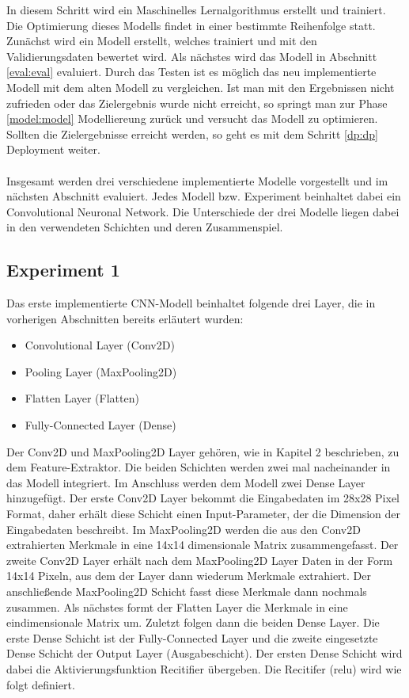 \documentclass[12pt]{scrreprt}
\begin{document}
In diesem Schritt wird ein Maschinelles Lernalgorithmus erstellt und trainiert. Die Optimierung dieses Modells findet in einer bestimmte Reihenfolge statt. Zunächst wird ein Modell erstellt, welches trainiert und mit den Validierungsdaten bewertet wird. Als nächstes wird das Modell in Abschnitt \ref{eval:eval} evaluiert. Durch das Testen ist es möglich das neu implementierte Modell mit dem alten Modell zu vergleichen. Ist man mit den Ergebnissen nicht zufrieden oder das Zielergebnis wurde nicht erreicht, so springt man zur Phase \ref{model:model} Modelliereung zurück und versucht das Modell zu optimieren. Sollten die Zielergebnisse erreicht werden, so geht es mit dem Schritt \ref{dp:dp} Deployment weiter.\\
\\
Insgesamt werden drei verschiedene implementierte Modelle vorgestellt und im nächsten Abschnitt evaluiert. Jedes Modell bzw. Experiment beinhaltet dabei ein Convolutional Neuronal Network. Die Unterschiede der drei Modelle liegen dabei in den verwendeten Schichten und deren Zusammenspiel. 
	
\subsection{Experiment 1}\label{model:ep1}
	
Das erste implementierte CNN-Modell beinhaltet folgende drei Layer, die in vorherigen Abschnitten bereits erläutert wurden:
	
\begin{itemize}
	\item Convolutional Layer (Conv2D)
	\item Pooling Layer (MaxPooling2D)
	\item Flatten Layer (Flatten)
	\item Fully-Connected Layer (Dense)
	\label{tab:model1}
\end{itemize}
	
Der Conv2D und MaxPooling2D Layer gehören, wie in Kapitel 2 beschrieben, zu dem Feature-Extraktor. Die beiden Schichten werden zwei mal nacheinander in das Modell integriert. Im Anschluss werden dem Modell zwei Dense Layer hinzugefügt. Der erste Conv2D Layer bekommt die Eingabedaten im 28x28 Pixel Format, daher erhält diese Schicht einen Input-Parameter, der die Dimension der Eingabedaten beschreibt. Im MaxPooling2D werden die aus den Conv2D extrahierten Merkmale in eine 14x14 dimensionale Matrix zusammengefasst. Der zweite Conv2D Layer erhält nach dem MaxPooling2D Layer Daten in der Form 14x14 Pixeln, aus dem der Layer dann wiederum Merkmale extrahiert. Der anschließende MaxPooling2D Schicht fasst diese Merkmale dann nochmals zusammen. Als nächstes formt der Flatten Layer die Merkmale in eine eindimensionale Matrix um. Zuletzt folgen dann die beiden Dense Layer. Die erste Dense Schicht ist der Fully-Connected Layer und die zweite eingesetzte Dense Schicht der Output Layer (Ausgabeschicht). Der ersten Dense Schicht wird dabei die Aktivierungsfunktion Recitifier übergeben. Die Recitifer (relu) wird wie folgt definiert.
	
\end{document}
